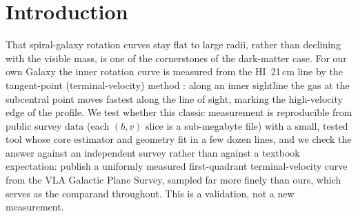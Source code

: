 \documentclass[twocolumn]{aastex631}
\begin{document}
\section{Introduction}
That spiral-galaxy rotation curves stay flat to large radii, rather than declining with the visible
mass, is one of the cornerstones of the dark-matter case. For our own Galaxy the inner rotation curve
is measured from the HI~21\,cm line by the tangent-point (terminal-velocity) method
\citep{mccluregriffiths2007}: along an inner sightline the gas at the subcentral point moves fastest
along the line of sight, marking the high-velocity edge of the profile. We test whether this classic
measurement is reproducible from public survey data (each $(b,v)$ slice is a sub-megabyte file) with
a small, tested tool whose core estimator and geometry fit in a few dozen lines, and we check the
answer against an independent survey rather than against a textbook expectation:
\citet{mccluregriffiths2016} publish a uniformly measured first-quadrant terminal-velocity curve
from the VLA Galactic Plane Survey, sampled far more finely than ours, which serves as the
comparand throughout. This is a validation, not a new measurement.
\end{document}
